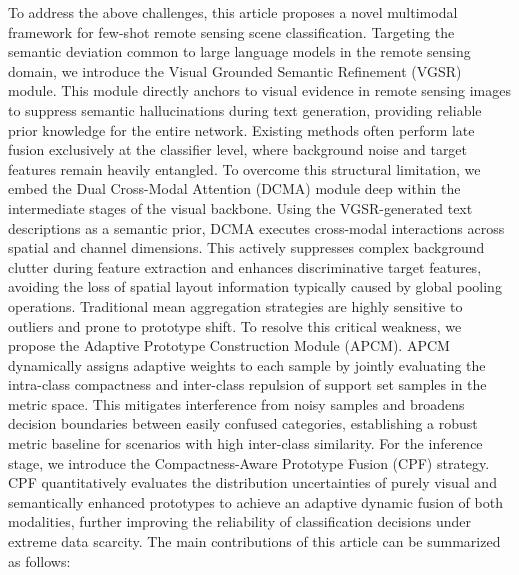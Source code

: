 \documentclass[lettersize,journal]{IEEEtran}
\begin{document}
To address the above challenges, this article proposes a novel multimodal framework for few-shot remote sensing scene classification. 
Targeting the semantic deviation common to large language models in the remote sensing domain, we introduce the Visual Grounded Semantic Refinement (VGSR) module. 
This module directly anchors to visual evidence in remote sensing images to suppress semantic hallucinations during text generation, providing reliable prior knowledge for the entire network. 
Existing methods often perform late fusion exclusively at the classifier level, where background noise and target features remain heavily entangled. 
To overcome this structural limitation, we embed the Dual Cross-Modal Attention (DCMA) module deep within the intermediate stages of the visual backbone. 
Using the VGSR-generated text descriptions as a semantic prior, DCMA executes cross-modal interactions across spatial and channel dimensions. 
This actively suppresses complex background clutter during feature extraction and enhances discriminative target features, avoiding the loss of spatial layout information typically caused by global pooling operations. 
Traditional mean aggregation strategies are highly sensitive to outliers and prone to prototype shift. 
To resolve this critical weakness, we propose the Adaptive Prototype Construction Module (APCM). 
APCM dynamically assigns adaptive weights to each sample by jointly evaluating the intra-class compactness and inter-class repulsion of support set samples in the metric space. 
This mitigates interference from noisy samples and broadens decision boundaries between easily confused categories, establishing a robust metric baseline for scenarios with high inter-class similarity. 
For the inference stage, we introduce the Compactness-Aware Prototype Fusion (CPF) strategy. 
CPF quantitatively evaluates the distribution uncertainties of purely visual and semantically enhanced prototypes to achieve an adaptive dynamic fusion of both modalities, further improving the reliability of classification decisions under extreme data scarcity.
The main contributions of this article can be summarized as follows:
\end{document}
